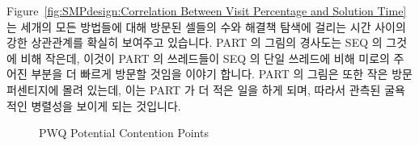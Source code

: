 Figure~\ref{fig:SMPdesign:Correlation Between Visit Percentage and Solution Time}
는 세개의 모든 방법들에 대해 방문된 셀들의 수와 해결책 탐색에 걸리는 시간
사이의 강한 상관관계를 확실히 보여주고 있습니다.
PART 의 그림의 경사도는 SEQ 의 그것에 비해 작은데, 이것이 PART 의 쓰레드들이
SEQ 의 단일 쓰레드에 비해 미로의 주어진 부분을 더 빠르게 방문할 것임을 이야기
합니다.
PART 의 그림은 또한 작은 방문 퍼센티지에 몰려 있는데, 이는 PART 가 더 적은 일을
하게 되며, 따라서 관측된 굴욕적인 병렬성을 보이게 되는 것입니다.

\begin{figure}[tb]
\centering
{}
\caption{PWQ Potential Contention Points}
\label{fig:SMPdesign:PWQ Potential Contention Points}
\end{figure}

